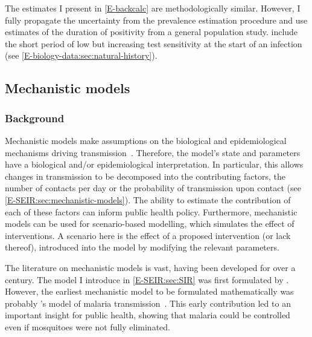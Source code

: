 \documentclass[thesis.tex]{subfiles}
\begin{document}
The estimates I present in \cref{E-backcalc} are methodologically similar.
However, I fully propagate the uncertainty from the prevalence estimation procedure and use estimates of the duration of positivity from a general population study.
\Textcite{abbottCISincidence} include the short period of low but increasing test sensitivity at the start of an infection (see \cref{E-biology-data:sec:natural-history}).


\subsection{Mechanistic models}

\subsubsection{Background}

Mechanistic models make assumptions on the biological and epidemiological mechanisms driving transmission~\autocite{lesslerMechanistic}.
Therefore, the model's state and parameters have a biological and/or epidemiological interpretation.
In particular, this allows changes in transmission to be decomposed into the contributing factors, \eg the number of contacts per day or the probability of transmission upon contact (see \cref{E-SEIR:sec:mechanistic-models}).
The ability to estimate the contribution of each of these factors can inform public health policy.
Furthermore, mechanistic models can be used for scenario-based modelling, which simulates the effect of interventions.
A scenario here is the effect of a proposed intervention (or lack thereof), introduced into the model by modifying the relevant parameters.

The literature on mechanistic models is vast, having been developed for over a century.
The model I introduce in \cref{E-SEIR:sec:SIR} was first formulated by \textcite{kermackContribution}.
However, the earliest mechanistic model to be formulated mathematically was probably \textcite{rossMalariaA}'s model of malaria transmission~\autocite{lesslerMechanistic}.
This early contribution led to an important insight for public health, showing that malaria could be controlled even if mosquitoes were not fully eliminated.
\end{document}
